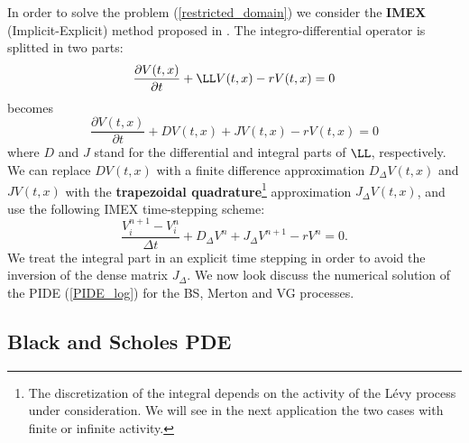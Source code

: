 In order to solve the problem (\ref{restricted_domain}) we consider the \textbf{IMEX} (Implicit-Explicit) method proposed in \cite{CoVo05b}.
The integro-differential operator is splitted in two parts:
$$ \frac{\partial V(t,x)}{\partial t} + \LL V(t,x) -r V(t,x) = 0 $$
becomes
$$ \frac{\partial V(t,x)}{\partial t} + D V(t,x) + J V(t,x) -r V(t,x) = 0 $$
where $D$ and $J$ stand for the differential and integral parts of $\LL$, respectively. We can replace $D V(t,x)$ with a finite difference approximation $D_{\Delta} V(t,x)$ 
and $J V(t,x)$
with the \textbf{trapezoidal quadrature}\footnote{The discretization of the integral depends on the activity of the Lévy process under consideration.
We will see in the next application the two cases with finite or infinite activity.} approximation $J_{\Delta} V(t,x)$, and use the following IMEX time-stepping scheme:
\begin{equation}
 \frac{V^{n+1}_{i} -V^{n}_{i}}{\Delta t} + D_{\Delta} V^{n} + J_{\Delta} V^{n+1} - r V^{n} = 0. 
\end{equation}
We treat the integral part in an explicit time stepping in order to avoid the inversion of the dense matrix $J_{\Delta}$. 
We now look discuss the numerical solution of the PIDE (\ref{PIDE_log}) for the BS, Merton and VG processes. 


\subsection{Black and Scholes PDE}

